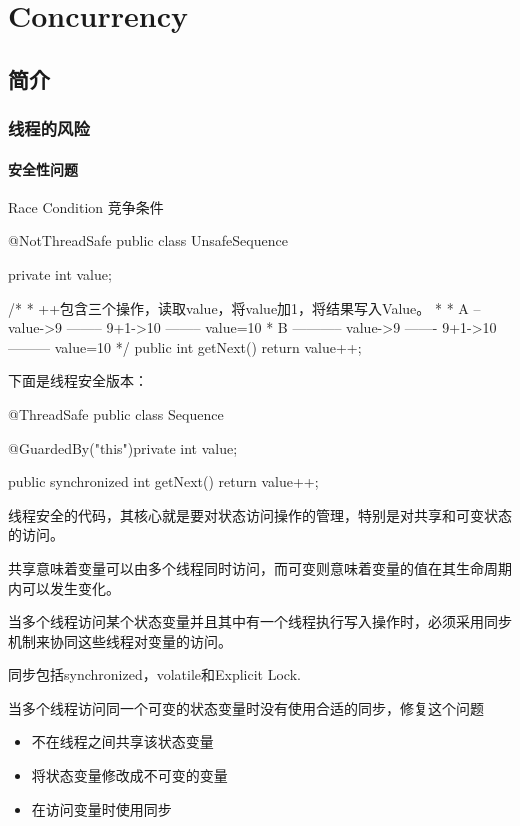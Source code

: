 \chapter{Concurrency}

\section{简介}
\subsection{线程的风险}



\subsubsection{安全性问题}
Race Condition 竞争条件

\begin{Java}
@NotThreadSafe
public class UnsafeSequence {

	private int value;

	/*
	 * ++包含三个操作，读取value，将value加1，将结果写入Value。
	 * 
	 * A   -- value->9 -------- 9+1->10 -------- value=10  
	 * B   ----------- value->9 ------- 9+1->10--------- value=10      
	 */
	public int getNext() {
		return value++;
	}
}
\end{Java}

下面是线程安全版本：
\begin{Java}
@ThreadSafe
public class Sequence {

	@GuardedBy("this")private int value;

	public synchronized int getNext() {
		return value++;
	}
}
\end{Java}

线程安全的代码，其核心就是要对状态访问操作的管理，特别是对共享和可变状态的访问。

共享意味着变量可以由多个线程同时访问，而可变则意味着变量的值在其生命周期内可以发生变化。

当多个线程访问某个状态变量并且其中有一个线程执行写入操作时，必须采用同步机制来协同这些线程对变量的访问。

同步包括synchronized，volatile和Explicit Lock.

当多个线程访问同一个可变的状态变量时没有使用合适的同步，修复这个问题
\begin{itemize}
\item 不在线程之间共享该状态变量
\item 将状态变量修改成不可变的变量
\item 在访问变量时使用同步
\end{itemize}

